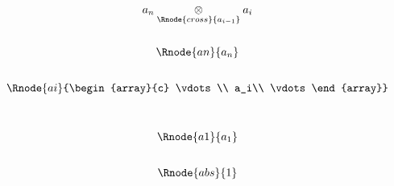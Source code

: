\begin{oldtt}
\begin{displaymath}
\begin{array}{c}
\crossx{a_n}{a_i}{\Rnode{cross}{a_{i-1}}} \\[0.9cm]
\Rnode{an}{a_n}\\[0.7cm]
\Rnode{ai}{\begin{array}{c}
\vdots\\
a_i\\
\vdots
\end{array}} \\[1.1cm]
\Rnode{a1}{a_1}\\[0.7cm]
\Rnode{abs}{1}
\end{array}
\end{displaymath}
\end{oldtt}
